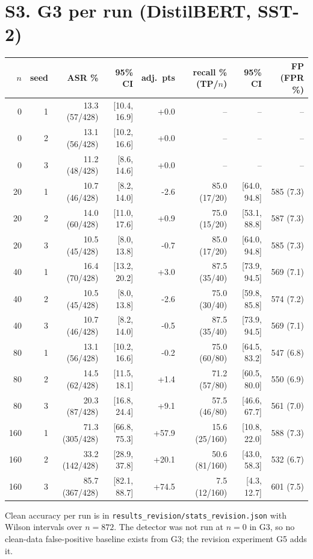 \documentclass[10pt,a4paper]{article}
\begin{document}
\section{S3. G3 per run (DistilBERT, SST-2)}
\small\begin{longtable}{rrrrrrrr}\toprule $n$ & seed & ASR \% & 95\% CI & adj.\ pts & recall \% (TP/$n$) & 95\% CI & FP (FPR \%)\\\midrule
0 & 1 & 13.3 (57/428) & [10.4, 16.9] & +0.0 & -- & -- & --\\
0 & 2 & 13.1 (56/428) & [10.2, 16.6] & +0.0 & -- & -- & --\\
0 & 3 & 11.2 (48/428) & [8.6, 14.6] & +0.0 & -- & -- & --\\
20 & 1 & 10.7 (46/428) & [8.2, 14.0] & -2.6 & 85.0 (17/20) & [64.0, 94.8] & 585 (7.3)\\
20 & 2 & 14.0 (60/428) & [11.0, 17.6] & +0.9 & 75.0 (15/20) & [53.1, 88.8] & 587 (7.3)\\
20 & 3 & 10.5 (45/428) & [8.0, 13.8] & -0.7 & 85.0 (17/20) & [64.0, 94.8] & 585 (7.3)\\
40 & 1 & 16.4 (70/428) & [13.2, 20.2] & +3.0 & 87.5 (35/40) & [73.9, 94.5] & 569 (7.1)\\
40 & 2 & 10.5 (45/428) & [8.0, 13.8] & -2.6 & 75.0 (30/40) & [59.8, 85.8] & 574 (7.2)\\
40 & 3 & 10.7 (46/428) & [8.2, 14.0] & -0.5 & 87.5 (35/40) & [73.9, 94.5] & 569 (7.1)\\
80 & 1 & 13.1 (56/428) & [10.2, 16.6] & -0.2 & 75.0 (60/80) & [64.5, 83.2] & 547 (6.8)\\
80 & 2 & 14.5 (62/428) & [11.5, 18.1] & +1.4 & 71.2 (57/80) & [60.5, 80.0] & 550 (6.9)\\
80 & 3 & 20.3 (87/428) & [16.8, 24.4] & +9.1 & 57.5 (46/80) & [46.6, 67.7] & 561 (7.0)\\
160 & 1 & 71.3 (305/428) & [66.8, 75.3] & +57.9 & 15.6 (25/160) & [10.8, 22.0] & 588 (7.3)\\
160 & 2 & 33.2 (142/428) & [28.9, 37.8] & +20.1 & 50.6 (81/160) & [43.0, 58.3] & 532 (6.7)\\
160 & 3 & 85.7 (367/428) & [82.1, 88.7] & +74.5 & 7.5 (12/160) & [4.3, 12.7] & 601 (7.5)\\
\bottomrule\end{longtable}\normalsize
Clean accuracy per run is in \texttt{results\_revision/stats\_revision.json} with Wilson intervals over $n=872$. The detector was not run at $n=0$ in G3, so no clean-data false-positive baseline exists from G3; the revision experiment G5 adds it.
\end{document}
